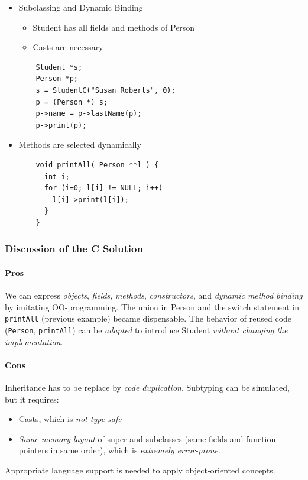 \begin{itemize}
\begin{lstlisting}
    printf("Name: %s\n", this->name);
    printf("No: %d\n", this->regNum);
  }
  Student *StudentC(String n, int r) {
    Student *this  = (Student *) malloc(sizeof(Student));
    this->name     = n
    this->print    = printStudent;
    this->lastName = (String (*)(Student*)) LN_Person;
    this->regNum   = r;
    return this;
  }
 \end{lstlisting}
 \item Subclassing and Dynamic Binding
  \begin{itemize}
   \item Student has all fields and methods of Person
   \item Casts are necessary
  \end{itemize}
  \begin{lstlisting}
    Student *s;
    Person *p;
    s = StudentC("Susan Roberts", 0);
    p = (Person *) s;
    p->name = p->lastName(p);
    p->print(p);
  \end{lstlisting}
  \item Methods are selected dynamically
  \begin{lstlisting}
    void printAll( Person **l ) {
      int i;
      for (i=0; l[i] != NULL; i++)
        l[i]->print(l[i]);
      }
    }
  \end{lstlisting}
\end{itemize}

\subsubsection{Discussion of the C Solution}

\paragraph{Pros} We can express \emph{objects}, \emph{fields}, \emph{methods}, \emph{constructors}, and \emph{dynamic method binding} by imitating OO-programming. The union in Person and the switch statement in \lstinline{printAll} (previous example) became dispensable.
The behavior of reused code (\lstinline{Person}, \lstinline{printAll}) can be \emph{adapted} to introduce Student \emph{without changing the implementation}.
\paragraph{Cons} Inheritance has to be replace by \emph{code duplication}. Subtyping can be simulated, but it requires:
\begin{itemize}
 \item Casts, which is \emph{not type safe}
 \item \emph{Same memory layout} of super and subclasses (same fields and function pointers in same order), which is \emph{extremely error-prone}.
\end{itemize}
Appropriate language support is needed to apply object-oriented concepts.

